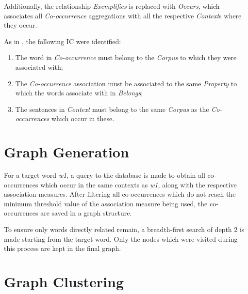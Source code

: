 Additionally, the relationship \emph{Exemplifies} is replaced with
\emph{Occurs}, which associates all \emph{Co-occurrence} aggregations with all
the respective \emph{Context}s where they occur.

As in \cite{correia2015syntax}, the following \ac{IC} were identified:

\begin{enumerate}
  \item The word in \emph{Co-occurrence} must belong to the \emph{Corpus} to
    which they were associated with;
  \item The \emph{Co-occurrence} association must be associated to the same
    \emph{Property} to which the words associate with in \emph{Belongs};
  \item The sentences in \emph{Context} must belong to the same \emph{Corpus}
    as the \emph{Co-occurrences} which occur in these.
\end{enumerate}

\section{Graph Generation}

For a target word \emph{w1}, a query to the database is made to obtain all
co-occurrences which occur in the same contexts as \emph{w1}, along with the
respective association measures. After filtering all co-occurrences which do not
reach the minimum threshold value of the association measure being used, the
co-occurrences are saved in a graph structure.

To ensure only words directly related remain, a breadth-first search of depth 2
is made starting from the target word. Only the nodes which were visited during
this process are kept in the final graph.

\section{Graph Clustering}



